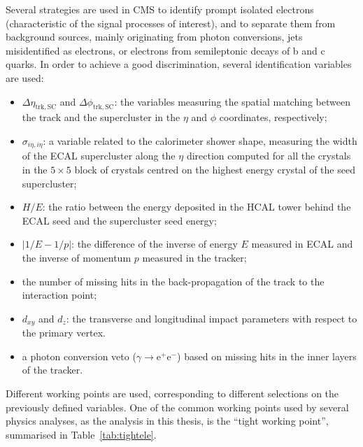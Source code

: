 Several strategies are used in CMS to identify prompt isolated electrons (characteristic of the signal processes of interest), and to separate them from background sources, mainly originating from photon conversions, jets misidentified as electrons, or electrons from semileptonic decays of b and c quarks. In order to achieve a good discrimination, several identification variables are used:
\begin{itemize}
\item $\Delta\eta_\mathrm{trk,SC}$ and $\Delta\phi_\mathrm{trk,SC}$: the variables measuring the spatial matching between the track and the supercluster in the $\eta$ and $\phi$ coordinates, respectively;
\item $\sigma_{i\eta,i\eta}$: a variable related to the calorimeter shower shape, measuring the width of the ECAL supercluster along the $\eta$ direction computed for all the crystals in the $5
\times 5$ block of crystals centred on the highest energy crystal of the seed supercluster;
\item $H/E$: the ratio between the energy deposited in the HCAL tower behind the ECAL seed and the supercluster seed energy;
\item $|1/E - 1/p|$: the difference of the inverse of energy $E$ measured in ECAL and the inverse of momentum $p$ measured in the tracker;
\item the number of missing hits in the back-propagation of the track to the interaction point;
\item $d_{xy}$ and $d_z$: the transverse and longitudinal impact parameters with respect to the primary vertex.
\item a photon conversion veto ($\gamma \to \mathrm{e^+ e^-}$) based on missing hits in the inner layers of the tracker.
\end{itemize}

Different working points are used, corresponding to different selections on the previously defined variables. One of the common working points used by several physics analyses, as the \hww analysis in this thesis, is the ``tight working point'', summarised in Table~\ref{tab:tightele}.

